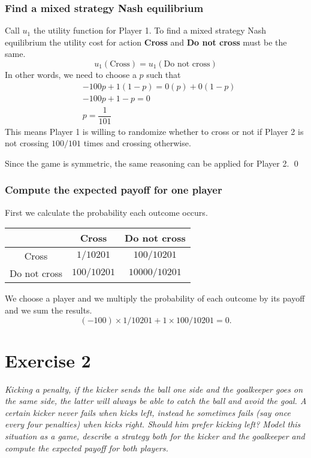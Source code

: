 \documentclass{article}
\begin{document}
\subsubsection*{Find a mixed strategy Nash equilibrium}
Call \(u_1\) the utility function for Player 1. To find a mixed strategy Nash equilibrium
the utility cost for action \textbf{Cross} and \textbf{Do not cross} must be the same.
\[
	u_1(\text{Cross}) = u_1(\text{Do not cross})
\]
In other words, we need to choose a \(p\) such that
\[
	\begin{aligned}
		& -100p + 1(1-p) = 0(p) + 0(1-p) \\
		& -100p + 1 - p = 0 \\
		& p = \dfrac{1}{101}
	\end{aligned}
\]
This means Player 1 is willing to randomize whether to cross or not if Player 2 is not crossing
\(100/101\) times and crossing otherwise.

Since the game is symmetric, the same reasoning can be applied for Player 2.
\qed

\subsubsection*{Compute the expected payoff for one player}
First we calculate the probability each outcome occurs.
\begin{center}
	\begin{tabular}{|c|c|c|}
        \hline
        & Cross & Do not cross \\\hline
        Cross &  \(1/10201\) & \(100/10201\) \\\hline
        Do not cross & \(100/10201\) & \(10000/10201\) \\\hline
  \end{tabular}
\end{center}

We choose a player and we multiply the probability of each outcome by its payoff and we
sum the results.
\[
	(-100) \times 1/10201 + 1 \times 100/10201 = 0.
\]

\section{Exercise 2}
{\itshape
Kicking a penalty, if the kicker sends the ball one side and the goalkeeper goes on the
same side, the latter will always be able to catch the ball and avoid the goal.
A certain kicker never fails when kicks left, instead he sometimes fails (say once
every four penalties) when kicks right. Should him prefer kicking left? Model this
situation as a game, describe a strategy both for the kicker and the goalkeeper and
compute the expected payoff for both players.
}
\end{document}
